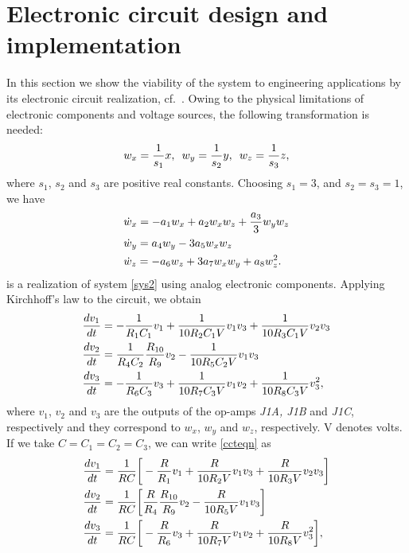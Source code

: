 \documentclass[final,5p,times,twocolumn]{elsarticle}
\begin{document}
\section{Electronic circuit design and  implementation}
\label{circuitdesign1}
In this section we show the viability of the system to engineering applications by its electronic circuit realization, cf.~\cite{pehlivan2019multiscroll,kapitaniak2018new,azar2017novel,wang2017new,nwachioma2017realization}. Owing to the physical limitations of electronic components and voltage sources, the following transformation is needed: 
\begin{equation}
w_{x} = {1\over s_1}x,\enspace w_{y} = {1\over s_2}y,\enspace w_{z} = {1\over s_3}z,%
\end{equation}
where $s_1$, $s_2$ and $s_3$ are positive real constants. Choosing $s_1 = 3$, and $s_2=s_3=1$, we have 
\begin{equation}
\begin{split}
&\dot{w}_{x} = -a_1w_{x}+a_2w_{x}w_{z}+{a_3\over3}w_{y}w_{z}\\
&\dot{w}_{y} = a_4w_{y}-3a_5w_{x}w_{z}\\
&\dot{w}_{z} = -a_6w_{z}+3a_7w_{x}w_{y}+a_8w_{z}^2\label{sys2}.
\end{split}
\end{equation}	
 is a realization of system \eqref{sys2} using analog electronic components. Applying Kirchhoff's law to the circuit, we obtain	
\begin{equation}
\begin{split}
&{dv_1\over dt} = -{1\over R_1C_1}v_1+{1\over 10R_2C_1V}v_1v_3+{1\over 10R_3C_1V}v_2v_3\\
&{dv_2\over dt} = {1\over R_4C_2}{R_{10}\over R_9}v_2-{1\over 10R_5C_2V}v_1v_3\\
&{dv_3\over dt} = -{1\over R_6C_3}v_3+{1\over 10R_7C_3V}v_1v_2+{1\over 10R_8C_3V}v_3^2,\label{ccteqn}
\end{split}
\end{equation}
where $v_1$, $v_2$ and $v_3$ are the outputs of the op-amps \textit{J1A, J1B} and \textit{J1C}, respectively and they correspond to $w_{x}$, $w_{y}$ and $w_{z}$, respectively. V denotes volts. If we take $C=C_1=C_2=C_3$, we can write \eqref{ccteqn} as
\begin{equation}
\begin{split}
&{dv_1\over dt} = {1\over RC}\bigg[-{R\over R_1}v_1+{R\over 10R_2V}v_1v_3+{R\over 10R_3V}v_2v_3\bigg]\\
&{dv_2\over dt} = {1\over RC}\bigg[{R\over R_4}{R_{10}\over R_9}v_2-{R\over 10R_5V}v_1v_3\bigg]\\
&{dv_3\over dt} = {1\over RC}\bigg[-{R\over R_6}v_3+{R\over 10R_7V}v_1v_2+{R\over10R_8V}v_3^2\bigg],\label{ccteqn2}
\end{split}
\end{equation}
\end{document}
